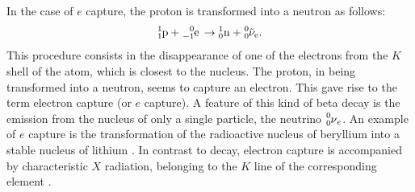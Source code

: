 In the case of $e$ capture, the proton is transformed into a neutron as follows:
\begin{equation*}%
\ce{^{1}_{1}{p} + ^{0}_{-1}{e} \to ^{1}_{0}{n} + ^{0}_{0}{\tilde{\nu}_e}}.
\end{equation*}
This procedure consists in the disappearance of one of the electrons from the $K$ shell of the atom, which is closest to the nucleus. The proton, in being transformed into a neutron, seems to capture an electron. This gave rise to the term electron capture (or $e$ capture). A feature of this kind of beta decay is the emission from the nucleus of only a single particle, the neutrino $\ce{^{0}_{0}\nu_{e}}$. An example of $e$ capture is the transformation of the radioactive nucleus of beryllium  into a stable nucleus of lithium . In contrast to  decay, electron capture is accompanied by characteristic $X$ radiation, belonging to the $K$ line of the corresponding
element .


\subsection{}\label{42.6.2} 

